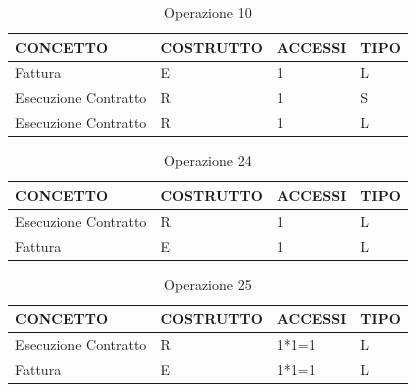 \begin{table}[H]
\centering
\caption{Operazione 10}
\begin{tabular}{llll}
\\ \hline
\multicolumn{1}{|l|}{\textbf{CONCETTO}} & \multicolumn{1}{l|}{\textbf{COSTRUTTO}} & \multicolumn{1}{l|}{\textbf{ACCESSI}} & \multicolumn{1}{l|}{\textbf{TIPO}} \\ \hline
\multicolumn{1}{|l|}{Fattura}             & \multicolumn{1}{l|}{E}                  & \multicolumn{1}{l|}{1}                & \multicolumn{1}{l|}{L}             \\ \hline
\multicolumn{1}{|l|}{Esecuzione Contratto}     & \multicolumn{1}{l|}{R}                  & \multicolumn{1}{l|}{1}                & \multicolumn{1}{l|}{S}             \\ \hline
\multicolumn{1}{|l|}{Esecuzione Contratto}
& \multicolumn{1}{l|}{R}                  & \multicolumn{1}{l|}{1}                & \multicolumn{1}{l|}{L}             \\ \hline
\end{tabular}
\end{table}

\begin{table}[H]
\centering
\caption{Operazione 24}
\begin{tabular}{llll}
\\ \hline
\multicolumn{1}{|l|}{\textbf{CONCETTO}} & \multicolumn{1}{l|}{\textbf{COSTRUTTO}} & \multicolumn{1}{l|}{\textbf{ACCESSI}} & \multicolumn{1}{l|}{\textbf{TIPO}} \\ \hline
\multicolumn{1}{|l|}{Esecuzione Contratto}
& \multicolumn{1}{l|}{R}                  & \multicolumn{1}{l|}{1}                & \multicolumn{1}{l|}{L}             \\ \hline
\multicolumn{1}{|l|}{Fattura}             & \multicolumn{1}{l|}{E}                  & \multicolumn{1}{l|}{1}                & \multicolumn{1}{l|}{L}             \\ \hline
\end{tabular}
\end{table}

\begin{table}[H]
\centering
\caption{Operazione 25}
\begin{tabular}{llll}
\\ \hline
\multicolumn{1}{|l|}{\textbf{CONCETTO}} & \multicolumn{1}{l|}{\textbf{COSTRUTTO}} & \multicolumn{1}{l|}{\textbf{ACCESSI}} & \multicolumn{1}{l|}{\textbf{TIPO}} \\ \hline
\multicolumn{1}{|l|}{Esecuzione Contratto}
& \multicolumn{1}{l|}{R}                  & \multicolumn{1}{l|}{1*1=1}                & \multicolumn{1}{l|}{L}             \\ \hline
\multicolumn{1}{|l|}{Fattura}             & \multicolumn{1}{l|}{E}                  & \multicolumn{1}{l|}{1*1=1}                & \multicolumn{1}{l|}{L}             \\ \hline
\end{tabular}
\end{table}

